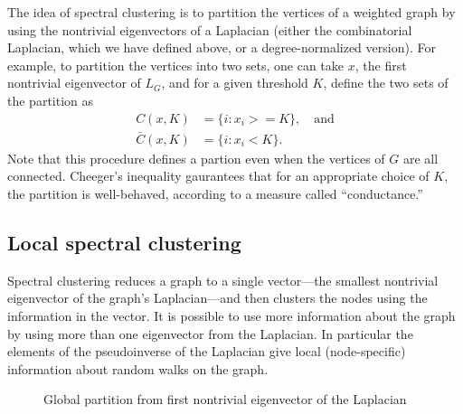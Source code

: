 \documentclass[12pt]{article}
\theoremstyle{plain}
\begin{document}
The idea of spectral clustering is to partition the vertices of a
weighted graph by using the nontrivial eigenvectors of a Laplacian
(either the combinatorial Laplacian, which we have defined above, or a
degree-normalized version).  For example, to partition the vertices
into two sets, one can take $x$, the first nontrivial eigenvector of
$L_G$, and for a given threshold $K$, define the two sets of the partition as
\begin{align*}
  C(x,K)      &= \{ i : x_i >= K \}, \quad \text{and} \\
  \bar C(x,K) &= \{ i : x_i < K \}.
\end{align*}
Note that this procedure defines a partion even when the vertices of
$G$ are all connected.  Cheeger's inequality gaurantees that for an
appropriate choice of $K$, the partition is well-behaved, according to a
measure called ``conductance.''


\subsection{Local spectral clustering}

Spectral clustering reduces a graph to a single vector---the smallest
nontrivial eigenvector of the graph's Laplacian---and then clusters
the nodes using the information in the vector.
It is possible to use
more information about the graph by using more than one eigenvector
from the Laplacian.  In particular the elements of the pseudoinverse
of the Laplacian give local (node-specific) information about random
walks on the graph.

\begin{figure}
    \centering
    \caption{Global partition from first nontrivial eigenvector of the Laplacian}
\end{figure}
\end{document}

